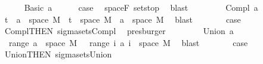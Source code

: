 \begin{isabellebody}
\ \ \ \ \isamarkupfalse%
\ {\isacharparenleft}{\kern0pt}Basic\ a{\isacharparenright}{\kern0pt}\isanewline
\ \ \ \ \isamarkupfalse%
\ {\isacharquery}{\kern0pt}case\ \isamarkupfalse%
\ space{\isacharunderscore}{\kern0pt}F\ sets{\isachardot}{\kern0pt}top\ \isamarkupfalse%
\ blast\isanewline
\ \ \isamarkupfalse%
\isanewline
\ \ \ \ \isamarkupfalse%
\ {\isacharparenleft}{\kern0pt}Compl\ a{\isacharparenright}{\kern0pt}\isanewline
\ \ \ \ \isamarkupfalse%
\ {\isachardoublequoteopen}{\isacharparenleft}{\kern0pt}{\isacharbraceleft}{\kern0pt}t\ {\isacharminus}{\kern0pt}\ a{\isacharparenright}{\kern0pt}\ {\isasymtimes}\ space\ M\ {\isacharequal}{\kern0pt}\ {\isacharbraceleft}{\kern0pt}t\ {\isasymtimes}\ space\ M\ {\isacharminus}{\kern0pt}\ a\ {\isasymtimes}\ space\ M{\isachardoublequoteclose}\ \isamarkupfalse%
\ blast\isanewline
\ \ \ \ \isamarkupfalse%
\ \isamarkupfalse%
\ {\isacharquery}{\kern0pt}case\ \isamarkupfalse%
\ Compl{\isacharparenleft}{\kern0pt}{}{\isacharparenright}{\kern0pt}{\isacharbrackleft}{\kern0pt}THEN\ sigma{\isacharunderscore}{\kern0pt}sets{\isachardot}{\kern0pt}Compl{\isacharbrackright}{\kern0pt}\ \isamarkupfalse%
\ presburger\isanewline
\ \ \isamarkupfalse%
\isanewline
\ \ \ \ \isamarkupfalse%
\ {\isacharparenleft}{\kern0pt}Union\ a{\isacharparenright}{\kern0pt}\isanewline
\ \ \ \ \isamarkupfalse%
\ {\isachardoublequoteopen}{\isasymUnion}\ {\isacharparenleft}{\kern0pt}range\ a{\isacharparenright}{\kern0pt}\ {\isasymtimes}\ space\ M\ {\isacharequal}{\kern0pt}\ {\isasymUnion}\ {\isacharparenleft}{\kern0pt}range\ {\isacharparenleft}{\kern0pt}{\isasymlambda}i{\isachardot}{\kern0pt}\ a\ i\ {\isasymtimes}\ space\ M{\isacharparenright}{\kern0pt}{\isacharparenright}{\kern0pt}{\isachardoublequoteclose}\ \isamarkupfalse%
\ blast\isanewline
\ \ \ \ \isamarkupfalse%
\ \isamarkupfalse%
\ {\isacharquery}{\kern0pt}case\ \isamarkupfalse%
\ Union{\isacharparenleft}{\kern0pt}{}{\isacharparenright}{\kern0pt}{\isacharbrackleft}{\kern0pt}THEN\ sigma{\isacharunderscore}{\kern0pt}sets{\isachardot}{\kern0pt}Union{\isacharbrackright}{\kern0pt}\ \isamarkupfalse%

\end{isabellebody}
